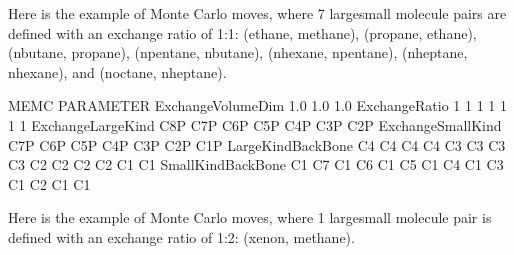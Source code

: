 \documentclass[letterpaper,10pt,english]{sphinxmanual}
\begin{document}
Here is the example of  Monte Carlo moves, where 7 large\sphinxhyphen{}small molecule pairs are defined with an exchange ratio of 1:1: (ethane, methane), (propane, ethane), (n\sphinxhyphen{}butane, propane), (n\sphinxhyphen{}pentane, nbutane), (n\sphinxhyphen{}hexane, n\sphinxhyphen{}pentane), (n\sphinxhyphen{}heptane, n\sphinxhyphen{}hexane), and (noctane, n\sphinxhyphen{}heptane).

\begin{sphinxVerbatim}[commandchars=\\\{\}]
\PYGZsh{}\PYGZsh{}\PYGZsh{}\PYGZsh{}\PYGZsh{}\PYGZsh{}\PYGZsh{}\PYGZsh{}\PYGZsh{}\PYGZsh{}\PYGZsh{}\PYGZsh{}\PYGZsh{}\PYGZsh{}\PYGZsh{}\PYGZsh{}\PYGZsh{}\PYGZsh{}\PYGZsh{}\PYGZsh{}\PYGZsh{}\PYGZsh{}\PYGZsh{}\PYGZsh{}\PYGZsh{}\PYGZsh{}\PYGZsh{}\PYGZsh{}\PYGZsh{}\PYGZsh{}\PYGZsh{}\PYGZsh{}\PYGZsh{}\PYGZsh{}\PYGZsh{}\PYGZsh{}\PYGZsh{}\PYGZsh{}\PYGZsh{}\PYGZsh{}\PYGZsh{}\PYGZsh{}\PYGZsh{}\PYGZsh{}\PYGZsh{}\PYGZsh{}\PYGZsh{}\PYGZsh{}\PYGZsh{}\PYGZsh{}\PYGZsh{}\PYGZsh{}\PYGZsh{}\PYGZsh{}\PYGZsh{}\PYGZsh{}\PYGZsh{}\PYGZsh{}\PYGZsh{}\PYGZsh{}\PYGZsh{}\PYGZsh{}\PYGZsh{}\PYGZsh{}\PYGZsh{}\PYGZsh{}\PYGZsh{}\PYGZsh{}\PYGZsh{}\PYGZsh{}
\PYGZsh{} MEMC PARAMETER
\PYGZsh{}\PYGZsh{}\PYGZsh{}\PYGZsh{}\PYGZsh{}\PYGZsh{}\PYGZsh{}\PYGZsh{}\PYGZsh{}\PYGZsh{}\PYGZsh{}\PYGZsh{}\PYGZsh{}\PYGZsh{}\PYGZsh{}\PYGZsh{}\PYGZsh{}\PYGZsh{}\PYGZsh{}\PYGZsh{}\PYGZsh{}\PYGZsh{}\PYGZsh{}\PYGZsh{}\PYGZsh{}\PYGZsh{}\PYGZsh{}\PYGZsh{}\PYGZsh{}\PYGZsh{}\PYGZsh{}\PYGZsh{}\PYGZsh{}\PYGZsh{}\PYGZsh{}\PYGZsh{}\PYGZsh{}\PYGZsh{}\PYGZsh{}\PYGZsh{}\PYGZsh{}\PYGZsh{}\PYGZsh{}\PYGZsh{}\PYGZsh{}\PYGZsh{}\PYGZsh{}\PYGZsh{}\PYGZsh{}\PYGZsh{}\PYGZsh{}\PYGZsh{}\PYGZsh{}\PYGZsh{}\PYGZsh{}\PYGZsh{}\PYGZsh{}\PYGZsh{}\PYGZsh{}\PYGZsh{}\PYGZsh{}\PYGZsh{}\PYGZsh{}\PYGZsh{}\PYGZsh{}\PYGZsh{}\PYGZsh{}\PYGZsh{}\PYGZsh{}\PYGZsh{}
ExchangeVolumeDim   1.0   1.0   1.0
ExchangeRatio       1       1       1      1      1      1      1
ExchangeLargeKind   C8P    C7P    C6P    C5P    C4P    C3P    C2P
ExchangeSmallKind   C7P    C6P    C5P    C4P    C3P    C2P    C1P
LargeKindBackBone   C4 C4  C4 C4  C3 C3  C3 C3  C2 C2  C2 C2  C1 C1
SmallKindBackBone   C1 C7  C1 C6  C1 C5  C1 C4  C1 C3  C1 C2  C1 C1
\end{sphinxVerbatim}

Here is the example of  Monte Carlo moves, where 1 large\sphinxhyphen{}small molecule pair is defined with an exchange ratio of 1:2: (xenon, methane).
\end{document}
